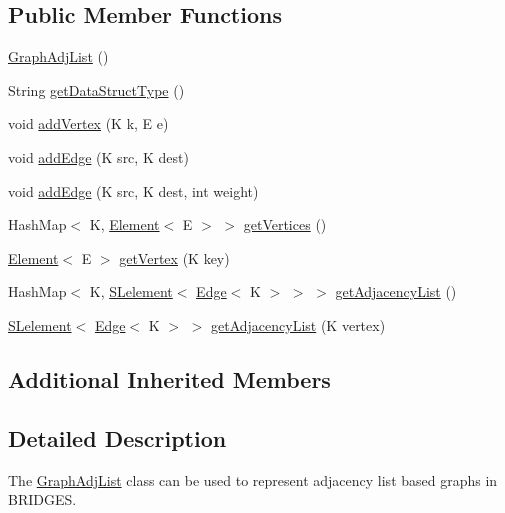 \subsection*{Public Member Functions}
\begin{DoxyCompactItemize}
\item 
\hyperlink{classbridges_1_1base_1_1_graph_adj_list_a822f5f0981773a227c98c463850a0700}{Graph\+Adj\+List} ()
\item 
String \hyperlink{classbridges_1_1base_1_1_graph_adj_list_a6995a5dcee3b07e041e12e27241f9423}{get\+Data\+Struct\+Type} ()
\item 
void \hyperlink{classbridges_1_1base_1_1_graph_adj_list_a2fdb7b6c143d1beb245a333db105372c}{add\+Vertex} (K k, E e)
\item 
void \hyperlink{classbridges_1_1base_1_1_graph_adj_list_a2cd649af7e518193912f3a752859a8c7}{add\+Edge} (K src, K dest)
\item 
void \hyperlink{classbridges_1_1base_1_1_graph_adj_list_a955fd8c7211f482826b47ad800702c10}{add\+Edge} (K src, K dest, int weight)
\item 
Hash\+Map$<$ K, \hyperlink{classbridges_1_1base_1_1_element}{Element}$<$ E $>$ $>$ \hyperlink{classbridges_1_1base_1_1_graph_adj_list_a19abf0bd09f0420e61cc144aec141f0a}{get\+Vertices} ()
\item 
\hyperlink{classbridges_1_1base_1_1_element}{Element}$<$ E $>$ \hyperlink{classbridges_1_1base_1_1_graph_adj_list_a0dd774aaa0ca1812880ec517e6bc4ed4}{get\+Vertex} (K key)
\item 
Hash\+Map$<$ K, \hyperlink{classbridges_1_1base_1_1_s_lelement}{S\+Lelement}$<$ \hyperlink{classbridges_1_1base_1_1_edge}{Edge}$<$ K $>$ $>$ $>$ \hyperlink{classbridges_1_1base_1_1_graph_adj_list_a61ebebad4b053797240fef2b42b57630}{get\+Adjacency\+List} ()
\item 
\hyperlink{classbridges_1_1base_1_1_s_lelement}{S\+Lelement}$<$ \hyperlink{classbridges_1_1base_1_1_edge}{Edge}$<$ K $>$ $>$ \hyperlink{classbridges_1_1base_1_1_graph_adj_list_a331531e9ce428c35321fae6df143fbcf}{get\+Adjacency\+List} (K vertex)
\end{DoxyCompactItemize}
\subsection*{Additional Inherited Members}


\subsection{Detailed Description}
The \hyperlink{classbridges_1_1base_1_1_graph_adj_list}{Graph\+Adj\+List} class can be used to represent adjacency list based graphs in B\+R\+I\+D\+G\+ES. 

